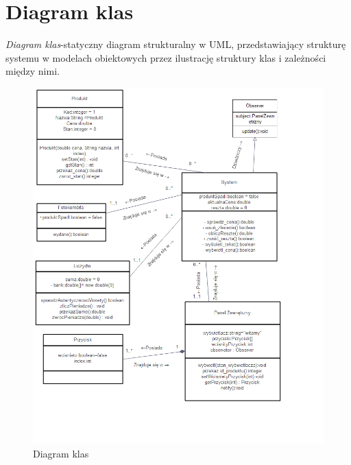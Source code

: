 \documentclass[a4paper, 11pt]{article}
\begin{document}
\section{Diagram klas}
\emph{Diagram klas}-statyczny diagram strukturalny w UML, przedstawiający strukturę systemu w modelach obiektowych przez ilustrację struktury klas i zależności między nimi.
\begin{figure}[H]
\centerline{\includegraphics[scale=0.9]{../Diagrams/diagramKlas4}}
\caption{Diagram klas}
\end{figure}
\end{document}
